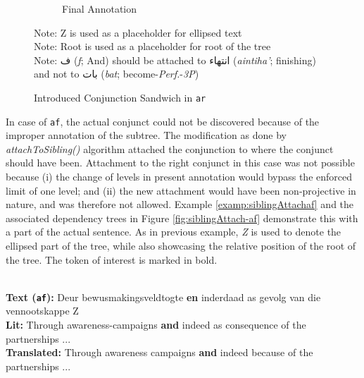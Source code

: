 \begin{figure}[H]
\begin{subfigure}{\textwidth}
    \caption{Final Annotation}
    \label{fig:siblingAttach-ar-2}
    \end{subfigure}
    \caption{Introduced Conjunction Sandwich in \texttt{ar}}
    Note: Z is used as a placeholder for ellipsed text\\
    Note: Root is used as a placeholder for root of the tree\\
    Note: \textarabic{ف} (\textit{f}; And) should be attached to \textarabic{انتهاء} (\textit{aintiha'}; finishing) and not to \textarabic{بات} (\textit{bat}; become-\textit{Perf.}-\textit{3P})
    \label{fig:siblingAttach-ar}
\end{figure}

 In case of \verb|af|, the actual conjunct could not be discovered because of the improper annotation of the subtree. The modification as done by \textit{attachToSibling()} algorithm attached the conjunction to where the conjunct should have been. Attachment to the right conjunct in this case was not possible because (i) the change of levels in present annotation would bypass the enforced limit of one level; and (ii) the new attachment would have been non-projective in nature, and was therefore not allowed. Example \ref{examp:siblingAttachaf} and the associated dependency trees in Figure \ref{fig:siblingAttach-af} demonstrate this with a part of the actual sentence. As in previous example, \textit{Z} is used to denote the ellipsed part of the tree, while also showcasing the relative position of the root of the tree. The token of interest is marked in bold.
 
\begin{example}
\label{examp:siblingAttachaf}
\textbf{ }\\
\textbf{Text (\texttt{af}):} Deur bewusmakingsveldtogte \textbf{en} inderdaad as gevolg van die vennootskappe Z\\
\textbf{Lit:} Through awareness-campaigns \textbf{and} indeed as consequence of the partnerships ...\\ 
\textbf{Translated:} Through awareness campaigns \textbf{and} indeed because of the partnerships ...
\end{example}


